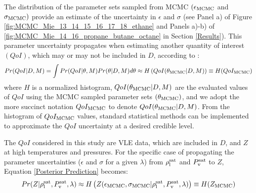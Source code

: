 \documentclass[journal=jctc,manuscript=article]{achemso}
\begin{document}
The 
distribution of the
parameter sets sampled from MCMC $(\epsilon_{\rm MCMC}$ and $\sigma_{\rm MCMC})$ provide an estimate of the uncertainty in $\epsilon$ and $\sigma$ (see Panel a) of Figure \ref{fig:MCMC_Mie_13_14_15_16_17_18_ethane} and Panels a)-b) of \ref{fig:MCMC_Mie_14_16_propane_butane_octane} in Section \ref{Results}). 
This parameter uncertainty propagates when estimating another quantity of interest $(QoI)$, which may or may not be included in $D$, according to \cite{Kulakova2017}:
\begin{equation} \label{Posterior Prediction}
Pr(QoI|D,M) = \int Pr(QoI|\theta,M) Pr(\theta|D,M) d\theta \approx H\left(QoI(\theta_{\rm MCMC}|D,M)\right) \equiv H(QoI_{\rm MCMC})
\end{equation}
where $H$ is a normalized histogram, $QoI(\theta_{\rm MCMC}|D,M)$ are the evaluated values of $QoI$ using the MCMC sampled parameter sets $(\theta_{\rm MCMC})$, and we adopt the more succinct notation $QoI_{\rm MCMC}$ to denote $QoI(\theta_{\rm MCMC}|D,M)$. From the histogram of $QoI_{\rm MCMC}$ values, standard statistical methods can be implemented to approximate the $QoI$ uncertainty at a desired credible level.

The $QoI$ considered in this study are VLE data, which are included in $D$, and $Z$ at high temperatures and pressures. For the specific case of propagating the parameter uncertainties ($\epsilon$ and $\sigma$ for a given $\lambda$) from $\rho_{\rm l}^{\rm sat}$ and $P_{\rm v}^{\rm sat}$ to $Z$, Equation \ref{Posterior Prediction} becomes:
\begin{equation} \label{Posterior Prediction Z}
Pr(Z|\rho_{\rm l}^{\rm sat},P_{\rm v}^{\rm sat},\lambda) \approx H\left(Z(\epsilon_{\rm MCMC},\sigma_{\rm MCMC}|\rho_{\rm l}^{\rm sat},P_{\rm v}^{\rm sat},\lambda)\right) \equiv H(Z_{\rm MCMC})
\end{equation}
 
\end{document}
